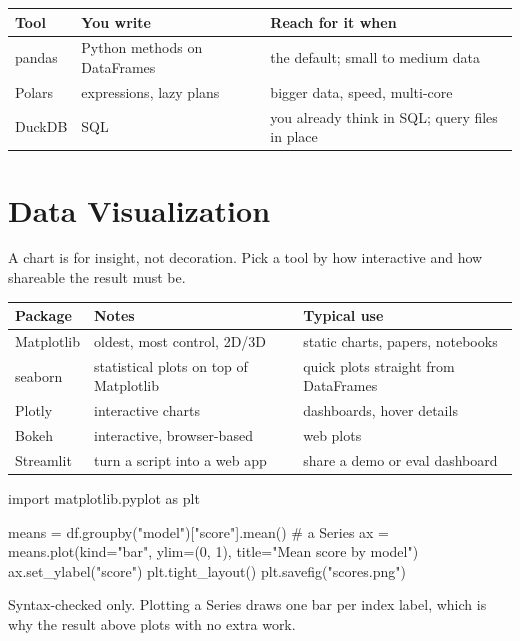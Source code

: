 \begin{center}
\begin{tabularx}{\linewidth}{@{}l X X@{}}
\toprule
\textbf{Tool} & \textbf{You write} & \textbf{Reach for it when} \\
\midrule
pandas & Python methods on DataFrames & the default; small to medium data \\
Polars & expressions, lazy plans & bigger data, speed, multi-core \\
DuckDB & SQL & you already think in SQL; query files in place \\
\bottomrule
\end{tabularx}
\end{center}

\section{Data Visualization}

A chart is for insight, not decoration. Pick a tool by how interactive and how shareable the
result must be.

\begin{center}
\begin{tabularx}{\linewidth}{@{}l X X@{}}
\toprule
\textbf{Package} & \textbf{Notes} & \textbf{Typical use} \\
\midrule
Matplotlib & oldest, most control, 2D/3D & static charts, papers, notebooks \\
seaborn & statistical plots on top of Matplotlib & quick plots straight from DataFrames \\
Plotly & interactive charts & dashboards, hover details \\
Bokeh & interactive, browser-based & web plots \\
Streamlit & turn a script into a web app & share a demo or eval dashboard \\
\bottomrule
\end{tabularx}
\end{center}

\begin{pycode}
import matplotlib.pyplot as plt

means = df.groupby("model")["score"].mean()      # a Series
ax = means.plot(kind="bar", ylim=(0, 1), title="Mean score by model")
ax.set_ylabel("score")
plt.tight_layout()
plt.savefig("scores.png")
\end{pycode}

Syntax-checked only. Plotting a Series draws one bar per index label, which is why the
 result above plots with no extra work.

